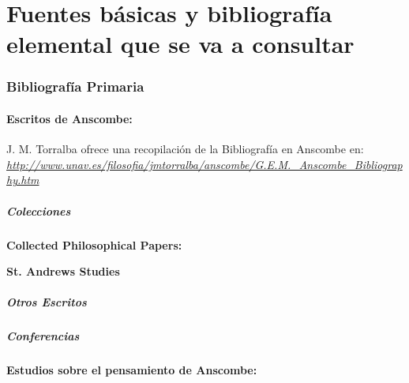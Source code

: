 \documentclass[11pt]{article}
\begin{document}
\part*{Fuentes básicas y bibliografía elemental que se va a consultar}

%

\section{Bibliografía Primaria}

\subsection {Escritos de Anscombe:}
\noindent J. M. Torralba ofrece una recopilación de la Bibliografía en Anscombe en:\\
\emph{\href{http://www.unav.es/filosofia/jmtorralba/anscombe/G.E.M.\_Anscombe\_Bibliography.htm}{http://www.unav.es/filosofia/jmtorralba/anscombe/G.E.M.\_Anscombe\_Bibliography.htm}}

\subsubsection{Colecciones}

\textbf{Collected Philosophical Papers:}
\nocite{collectedppIref}
\nocite{collectedppIIref}
\nocite{collectedppIIIref}
\printbibliography[heading=none,keyword=anscombe]


\textbf{St. Andrews Studies}
\nocite{hlaeref}
\nocite{fhgref}
\nocite{ptowref}
\printbibliography[heading=none,keyword=standrews]

\subsubsection{Otros Escritos}
\nocite{intentionref}
\nocite{introtractref}
\printbibliography[heading=none,keyword=otros]

\subsubsection{Conferencias}
\nocite{torralbaref}
\printbibliography[heading=none,keyword=conferencias]

\subsection{Estudios sobre el pensamiento de Anscombe:}
\end{document}
